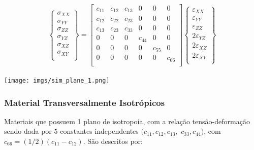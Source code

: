 \documentclass{article}
\begin{document}
\begin{minipage}{.5\textwidth}
    \begin{align*}
        \begin{Bmatrix}
            \sigma_{XX} \\
            \sigma_{YY} \\
            \sigma_{ZZ} \\
            \sigma_{YZ} \\
            \sigma_{XZ} \\
            \sigma_{XY} \\
        \end{Bmatrix} =
        \begin{bmatrix}
            c_{11} & c_{12} & c_{13} & 0      & 0      & 0      \\
            c_{12} & c_{22} & c_{23} & 0      & 0      & 0      \\
            c_{13} & c_{23} & c_{33} & 0      & 0      & 0      \\
            0      & 0      & 0      & c_{44} & 0      & 0      \\
            0      & 0      & 0      & 0      & c_{55} & 0      \\
            0      & 0      & 0      & 0      & 0      & c_{66} \\
        \end{bmatrix}
        \begin{Bmatrix}
            \varepsilon_{XX}  \\
            \varepsilon_{YY}  \\
            \varepsilon_{ZZ}  \\
            2\varepsilon_{YZ} \\
            2\varepsilon_{XZ} \\
            2\varepsilon_{XY} \\
        \end{Bmatrix}
    \end{align*}
\end{minipage}
\begin{minipage}{.5\textwidth}
    \centering
    \texttt{[image: imgs/sim\_plane\_1.png]}
\end{minipage}

\subsubsection*{Material Transversalmente Isotrópicos}
Materiais que possuem 1 plano de isotropoia, com a relação tensão-deformação sendo dada por $5$ constantes independentes $(c_{11}, c_{12}, c_{13},  $ $ c_{33}, c_{44})$, com $c_{66} = (1/2)(c_{11} - c_{12})$. São descritos por:
\end{document}
